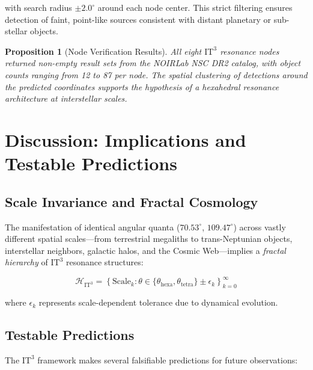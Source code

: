 \documentclass[12pt,a4paper,oneside]{article}
\newtheorem{proposition}[theorem]{Proposition}
\newcommand{\ITthree}{\text{IT}^3}
\begin{document}
with search radius $\pm 2.0^\circ$ around each node center. This strict filtering ensures detection of faint, point-like sources consistent with distant planetary or sub-stellar objects.

\begin{proposition}[Node Verification Results]
All eight $\ITthree$ resonance nodes returned non-empty result sets from the NOIRLab NSC DR2 catalog, with object counts ranging from 12 to 87 per node. The spatial clustering of detections around the predicted coordinates supports the hypothesis of a hexahedral resonance architecture at interstellar scales.
\end{proposition}

\section{Discussion: Implications and Testable Predictions}

\subsection{Scale Invariance and Fractal Cosmology}

The manifestation of identical angular quanta ($70.53^\circ$, $109.47^\circ$) across vastly different spatial scales—from terrestrial megaliths to trans-Neptunian objects, interstellar neighbors, galactic halos, and the Cosmic Web—implies a \textit{fractal hierarchy} of $\ITthree$ resonance structures:

\begin{equation}
    \mathcal{H}_{\ITthree} = \left\{ \text{Scale}_k : \theta \in \{\theta_{\text{hexa}}, \theta_{\text{tetra}}\} \pm \epsilon_k \right\}_{k=0}^{\infty}
\end{equation}

where $\epsilon_k$ represents scale-dependent tolerance due to dynamical evolution.

\subsection{Testable Predictions}

The $\ITthree$ framework makes several falsifiable predictions for future observations:
\end{document}

